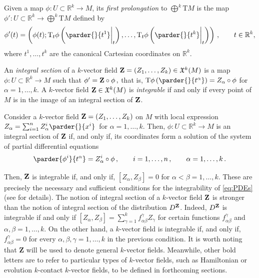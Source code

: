 \documentclass[11pt,twoside]{article}
\theoremstyle{plain}
\theoremstyle{definition}
\theoremstyle{remark}
\newcommand{\R}{\mathbb{R}}
\newcommand{\T}{\mathrm{T}}
\begin{document}
 
    Given a map $\phi\colon U\subset\R^k\to M$, its {\it first prolongation} to $\bigoplus^k\T M$ is the map $\phi'\colon U\subset\R^k\to\bigoplus^k\T M$ 
    defined by
    $$ \phi'(t) = \left( \phi(t); \T_t\phi\left( \parder{}{t^1}\bigg\vert_t \right),\dotsc,\T_t\phi\left( \parder{}{t^k}\bigg\vert_t \right) \right)\,, \qquad t\in\mathbb{R}^k, $$
    where $t^1,\dotsc,t^k$ are the canonical Cartesian coordinates on $\R^k$.
 
An {\it integral section} of a $k$-vector field ${\bf Z} = (Z_1,\dotsc,Z_k)\in\mathfrak{X}^k(M)$ is a map $\phi\colon U\subset\R^k\to M$ such that
    $ \phi' = {\bf Z}\circ\phi\,, $
    that is, $\T\phi \left(\parder{}{t^\alpha}\right) = Z_\alpha\circ\phi$ for $\alpha=1,\dotsc,k$. A $k$-vector field ${\bf Z}\in\mathfrak{X}^k(M)$ is {\it integrable} if and only if every point of $M$ is in the image of an integral section of ${\bf Z}$.
 

Consider a $k$-vector field ${\bf Z} = (Z_1,\dotsc, Z_k)$ on $M$ with local expression $ Z_\alpha = \sum_{i=1}^nZ_\alpha^i\parder{}{x^i}\,$ for $\alpha=1,\dotsc,k$. 
Then, $\phi\colon U\subset\R^k\to M$ is an integral section of ${\bf Z}$ if, and only if, its coordinates form a solution of the system of partial differential equations
\begin{equation}
\label{eq:PDEs}
\parder{\phi^i}{t^\alpha} = Z_\alpha^i\circ\phi\,,\qquad i=1,\dotsc,n\,,\qquad \alpha=1,\dotsc,k\,.
\end{equation}

Then, ${\bf Z}$ is integrable if, and only if, $[Z_\alpha,Z_\beta] = 0$ for $\alpha<\beta=1,\dotsc,k$. These are precisely the necessary and sufficient conditions for the integrability of \eqref{eq:PDEs} (see \cite{Lee_13} for details). 
The notion of integral section of a $k$-vector field ${\bf Z}$ is stronger than the notion of integral section of the distribution $D^{\bf Z}$. Indeed,  $D^{\bf Z}$ is integrable if and only if $[Z_\alpha,Z_\beta] = \sum_{\gamma=1}^kf_{\alpha\beta}^\gamma Z_\gamma$ for certain functions $f_{\alpha\beta}^\gamma$ and $\alpha,\beta=1,\ldots,k$. On the other hand, a $k$-vector field is integrable if, and only if, $f_{\alpha\beta}^\gamma = 0$ for every $\alpha,\beta,\gamma=1,\ldots,k$ in the previous condition. It is worth noting that ${\bm Z}$ will be used to denote general $k$-vector fields. Meanwhile, other bold letters are to refer to particular types of $k$-vector fields, such as Hamiltonian or evolution $k$-contact $k$-vector fields, to be defined in forthcoming sections.
\end{document}
